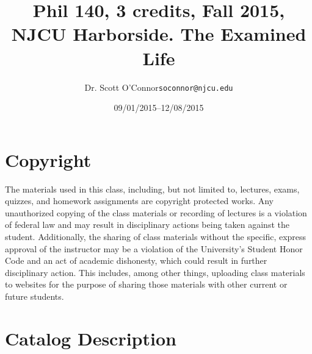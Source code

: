 \documentclass[11pt,article,oneside]{memoir}
\makeatletter
\def\myauthor{Author}
\def\mytitle{Title}
\def\mycopyright{\myauthor}
\def\myemail{soconnor@njcu.edu}
\def\myauthor{Dr. Scott O'Connor}
\def\mytitle{{\normalsize Phil 140, 3 credits, Fall 2015, NJCU Harborside. \newline} \HUGE The Examined Life}
\makeatother
\begin{document}
\setsansfont[Mapping=tex-text]{Georgia} 
\setmonofont[Mapping=tex-text,Scale=0.8]{Georgia} 

\def\ind{\hangindent=1 true cm\hangafter=1 \noindent}
\def\labelitemi{$\cdot$}

\pagestyle{kjh}

\title{\LARGE \mytitle}     
\author{\Large\myauthor \newline \footnotesize\texttt{\noindent\myemail}}
\date{09/01/2015--12/08/2015}

\published{\,}

\maketitle




%
%

\section{Copyright}
The materials used in this class, including, but not limited to, lectures, exams, quizzes, and homework assignments are copyright protected works.  Any unauthorized copying of the class materials or recording of lectures is a violation of federal law and may result in disciplinary actions being taken against the student.  Additionally, the sharing of class materials without the specific, express approval of the instructor may be a violation of the University's Student Honor Code and an act of academic dishonesty, which could result in further disciplinary action.  This includes, among other things, uploading class materials to websites for the purpose of sharing those materials with other current or future students. 

\section{Catalog Description}
\end{document}

